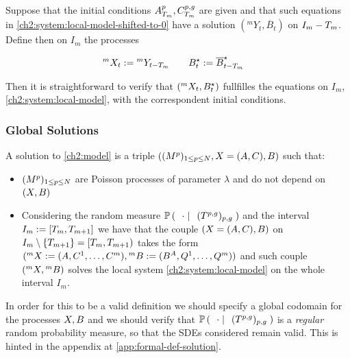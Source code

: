 Suppose that the initial conditions $A_{T_m}^p,C_{T_m}^{p,g}$ are given and that such equations in \ref{ch2:system:local-model-shifted-to-0} have a solution $({}^m Y_t, \overline{B}_t)$ on $I_m - T_m$.
Define then on $I_m$ the processes

\begin{align*}
{}^{m}X_t := {}^m Y_{t-T_m}
\qquad
& B_t^{\star} := \overline{B}_{t-T_m}^{\star}
\end{align*}

Then it is straightforward to verify that $({}^{m}X_t,B_t^{\star})$ fullfilles the equations on $I_m$, \ie \ref{ch2:system:local-model}, with the correspondent initial conditions.

\subsubsection{Global Solutions}

\begin{definition}\label{ch2:def:solution-model}
A solution to \ref{ch2:model} is a triple $((M^p)_{1\leq p \leq N}, X = (A, C), B)$ such that:
\begin{itemize}
\item $(M^p)_{1\leq p\leq N}$ are Poisson processes of parameter $\lambda$ and do not depend on $(X, B)$
\item Considering the random measure $\mathbb{P} \left( \; \left. \; \cdot \; \right| \; \;(T^{p,g})_{p,g}  \; \right)$ and the interval $I_m := [T_m, T_{m+1}]$ we have that the couple $(X = (A, C), B)$ on $I_m \setminus \{ T_{m+1}\} = [T_m, T_{m+1})$ takes the form $({}^mX := (A, C^1, \ldots, C^m), {}^mB := (B^A, Q^1, \ldots, Q^m))$ and such couple $({}^mX, {}^mB)$ solves the local system \ref{ch2:system:local-model} on the whole interval $I_m$.
\end{itemize}
\end{definition}

In order for this to be a valid definition we should specify a global codomain for the processes $X, B$ and we should verify that $\mathbb{P} \left( \; \left. \; \cdot \; \right| \; \;(T^{p,g})_{p,g}  \; \right)$ is a \emph{regular} random probability measure, so that the SDEs considered remain valid.
This is hinted in the appendix at \ref{app:formal-def-solution}.

